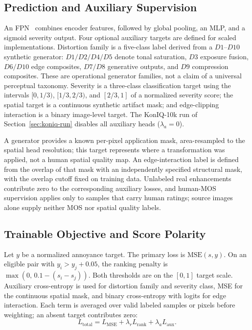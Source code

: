 \documentclass[5p,times,twocolumn]{elsarticle}
\begin{document}
\subsection{Prediction and Auxiliary Supervision}
\label{sec:heads}

An FPN~\cite{lin2017fpn} combines encoder features, followed by global
pooling, an MLP, and a sigmoid severity output. Four optional auxiliary
targets are defined for scaled implementations. Distortion family is a
five-class label derived from a $D1$--$D10$ synthetic generator: $D1/D2/D4/D5$
denote tonal saturation, $D3$ exposure fusion, $D6/D10$ edge composites,
$D7/D8$ generative outputs, and $D9$ compression composites. These are
operational generator families, not a claim of a universal perceptual
taxonomy. Severity is a three-class classification target using the intervals
$[0, 1/3)$, $[1/3, 2/3)$, and $[2/3, 1]$ of a normalized severity score; the
spatial target is a continuous synthetic artifact mask; and edge-clipping
interaction is a binary image-level target. The KonIQ-10k run of
Section~\ref{sec:koniq-run} disables all auxiliary heads ($\lambda_a = 0$).

A generator provides a known per-pixel application mask, area-resampled to the
spatial head resolution; this target represents where a transformation was
applied, not a human spatial quality map. An edge-interaction label is defined
from the overlap of that mask with an independently specified structural mask,
with the overlap cutoff fixed on training data. Unlabeled real enhancements
contribute zero to the corresponding auxiliary losses, and human-MOS
supervision applies only to samples that carry human ratings; source images
alone supply neither MOS nor spatial quality labels.

\subsection{Trainable Objective and Score Polarity}
\label{sec:objective}

Let $y$ be a normalized annoyance target. The primary loss is
$\mathrm{MSE}(s, y)$. On an eligible pair with $y_i > y_j + 0.05$, the ranking
penalty is $\max(0,\, 0.1 - (s_i - s_j))$. Both thresholds are on the $[0,1]$
target scale. Auxiliary cross-entropy is used for distortion family and
severity class, MSE for the continuous spatial mask, and binary cross-entropy
with logits for edge interaction. Each term is averaged over valid labeled
samples or pixels before weighting; an absent target contributes zero:
\begin{equation}
L_{\mathrm{total}} = L_{\mathrm{MSE}}
+ \lambda_r L_{\mathrm{rank}} + \lambda_a L_{\mathrm{aux}}.
\label{eq:total}
\end{equation}
\end{document}
